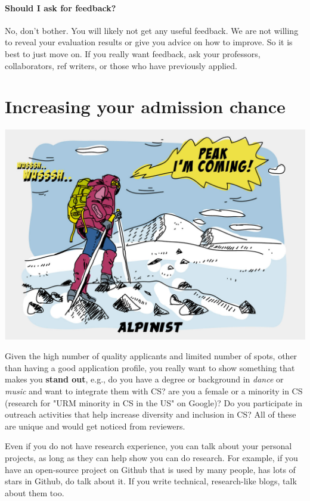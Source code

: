 \documentclass[oneside,11pt]{memoir}
\begin{document}
\paragraph{Should I ask for feedback?}
No, don't bother.  You will likely not get any useful feedback.  We are not willing to reveal your evaluation results or give you advice on how to improve. So it is best to just move on.  If you really want feedback, ask your professors, collaborators, ref writers, or those who have previously applied.

\section{Increasing your admission chance}\label{sec:improve-your-chance}

\begin{center}
  \includegraphics[scale=0.2]{files/alpinist-climbing-peak-mountain-comic-hand-drawn-vector-illustration.jpg}
\end{center}


Given the high number of quality applicants and limited number of spots, other than having a good application profile, you really want to show something that makes you \textbf{stand out}, e.g., do you have a degree or background in \emph{dance} or \emph{music} and want to integrate them with CS? are you a female or a minority in CS (research for "URM minority in CS in the US" on Google)? Do you participate in outreach activities that help increase diversity and inclusion in CS? All of these are unique and would get noticed from reviewers.

Even if you do not have research experience, you can talk about your personal projects, as long as they can help show you can do research. For example, if you have an open-source project on Github that is used by many people, has lots of stars in Github, do talk about it. If you write technical, research-like blogs, talk about them too.
\end{document}
